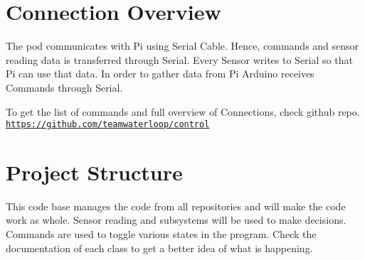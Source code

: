 \hypertarget{index_connection_sec}{}\section{Connection Overview}\label{index_connection_sec}
The pod communicates with Pi using Serial Cable. Hence, commands and sensor reading data is transferred through Serial. Every Sensor writes to Serial so that Pi can use that data. In order to gather data from Pi Arduino receives Commands through Serial.

To get the list of commands and full overview of Connections, check github repo. \href{https://github.com/teamwaterloop/control}{\tt https\+://github.\+com/teamwaterloop/control}\hypertarget{index_project_sec}{}\section{Project Structure}\label{index_project_sec}
This code base manages the code from all repositories and will make the code work as whole. Sensor reading and subsystems will be used to make decisions. Commands are used to toggle various states in the program. Check the documentation of each class to get a better idea of what is happening. 